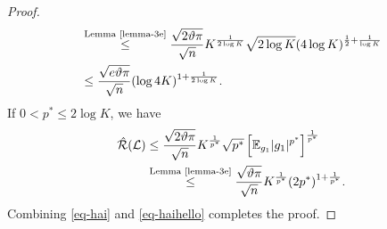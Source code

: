\documentclass{article}
\begin{document}
\begin{proof}
\begin{align}
     \nonumber &\overset{\text{Lemma \ref{lemma-3e}}}\leq \frac{\sqrt{2\vartheta\pi}}{\sqrt{n}} K^{\frac{1}{2\log K }}\sqrt{2\log K}(4\log K)^{\frac{1}{2}+\frac{1}{\log K}}\\
     &\leq \frac{\sqrt{e\vartheta\pi}}{\sqrt{n}}(\log 4K)^{1+\frac{1}{2\log K}}.
  \end{align}
  If $0<p^\ast\leq 2\log K$,
  we have
  \begin{align}
  \label{eq-haihello}
    \nonumber \hat{\mathcal{R}}(\mathcal{L})&\leq \frac{\sqrt{2\vartheta\pi}}{\sqrt{n}} K^{\frac{1}{p^\ast}}\sqrt{p^\ast}
    \left[\mathbb{E}_{g_1}|g_1|^{p^\ast}\right]^\frac{1}{p^\ast}\\
    &\overset{\text{Lemma \ref{lemma-3e}}}\leq \frac{\sqrt{\vartheta\pi}}{\sqrt{n}} K^{\frac{1}{p^\ast}}(2p^\ast)^{1+\frac{1}{p^\ast}}.
  \end{align}
  Combining \eqref{eq-hai} and \eqref{eq-haihello} completes the proof.
\end{proof}
\end{document}
